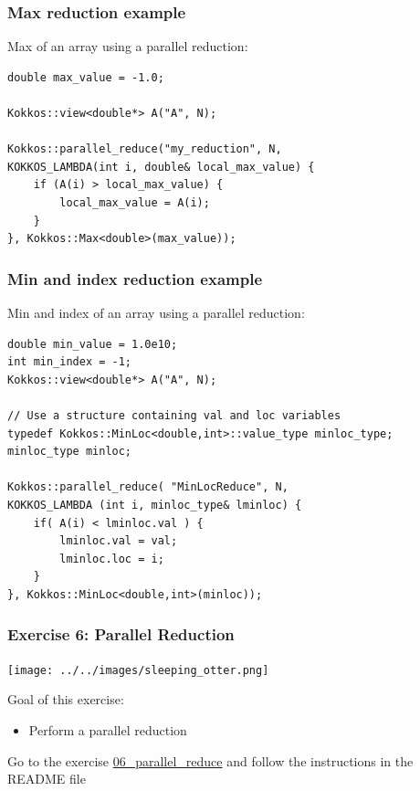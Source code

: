 \documentclass[aspectratio=169]{beamer}
\begin{document}

\begin{frame}[fragile]
    \frametitle{Max reduction example}

Max of an array using a parallel reduction:

\footnotesize
\begin{verbatim}
double max_value = -1.0;

Kokkos::view<double*> A("A", N);

Kokkos::parallel_reduce("my_reduction", N,
KOKKOS_LAMBDA(int i, double& local_max_value) {
    if (A(i) > local_max_value) {
        local_max_value = A(i);
    }
}, Kokkos::Max<double>(max_value));
\end{verbatim}

\end{frame}


\begin{frame}[fragile]
    \frametitle{Min and index reduction example}

Min and index of an array using a parallel reduction:

\footnotesize
\begin{verbatim}
double min_value = 1.0e10;
int min_index = -1;
Kokkos::view<double*> A("A", N);

// Use a structure containing val and loc variables
typedef Kokkos::MinLoc<double,int>::value_type minloc_type;
minloc_type minloc;

Kokkos::parallel_reduce( "MinLocReduce", N,
KOKKOS_LAMBDA (int i, minloc_type& lminloc) {
    if( A(i) < lminloc.val ) { 
        lminloc.val = val;
        lminloc.loc = i;
    }
}, Kokkos::MinLoc<double,int>(minloc));
\end{verbatim}

\end{frame}


\begin{frame}[fragile]
    \frametitle{Exercise 6: Parallel Reduction} 

    \begin{center}
    \texttt{[image: ../../images/sleeping\_otter.png]}
    \end{center}

    Goal of this exercise:

    \begin{itemize}
        \item Perform a parallel reduction
    \end{itemize}

    \begin{block}{}
        Go to the exercise \href{https://github.com/CExA-project/cexa-kokkos-tutorials/tree/main/exercises/06_parallel_reduce}{06\_parallel\_reduce} and follow the instructions in the README file
    \end{block}

\end{frame}
\end{document}
